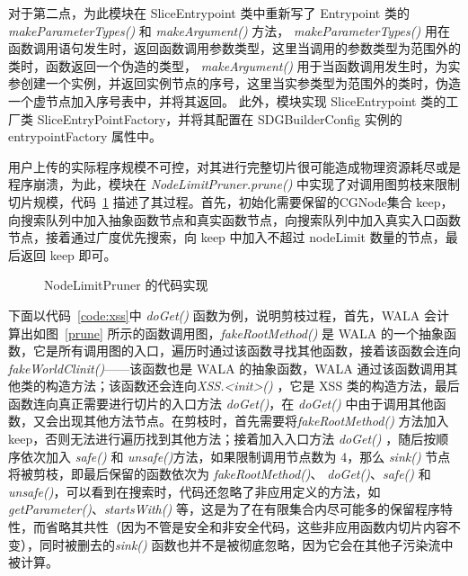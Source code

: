 对于第二点，为此模块在 SliceEntrypoint 类中重新写了 Entrypoint 类的\textit{ makeParameterTypes()} 和 \textit{makeArgument()} 方法，\textit{ makeParameterTypes()} 用在函数调用语句发生时，返回函数调用参数类型，这里当调用的参数类型为范围外的类时，函数返回一个伪造的类型，\textit{ makeArgument()} 用于当函数调用发生时，为实参创建一个实例，并返回实例节点的序号，这里当实参类型为范围外的类时，伪造一个虚节点加入序号表中，并将其返回。
此外，模块实现 SliceEntrypoint 类的工厂类 SliceEntryPointFactory，并将其配置在 SDGBuilderConfig 实例的 entrypointFactory 属性中。


用户上传的实际程序规模不可控，对其进行完整切片很可能造成物理资源耗尽或是程序崩溃，为此，模块在 \textit{NodeLimitPruner.prune()} 中实现了对调用图剪枝来限制切片规模，代码~\ref{code:slicePruner} 描述了其过程。首先，初始化需要保留的CGNode集合 keep，向搜索队列中加入抽象函数节点和真实函数节点，向搜索队列中加入真实入口函数节点，接着通过广度优先搜索，向 keep 中加入不超过 nodeLimit 数量的节点，最后返回 keep 即可。

\begin{figure}[htbp]
    \centering
    \begin{minipage}{0.9\textwidth}
        
    \end{minipage}
    \caption{NodeLimitPruner 的代码实现}\label{code:slicePruner}
\end{figure}

下面以代码~\ref{code:xss}中 \textit{doGet()} 函数为例，说明剪枝过程，首先，WALA 会计算出如图~\ref{prune} 所示的函数调用图，\textit{fakeRootMethod()} 是 WALA 的一个抽象函数，它是所有调用图的入口，遍历时通过该函数寻找其他函数，接着该函数会连向 \textit{fakeWorldClinit()}——该函数也是 WALA 的抽象函数，WALA 通过该函数调用其他类的构造方法；该函数还会连向\textit{XSS.<init>()} ，它是 XSS 类的构造方法，最后函数连向真正需要进行切片的入口方法 \textit{doGet()}，在 \textit{doGet()} 中由于调用其他函数，又会出现其他方法节点。在剪枝时，首先需要将\textit{fakeRootMethod()} 方法加入 keep，否则无法进行遍历找到其他方法；接着加入入口方法 \textit{doGet()} ，随后按顺序依次加入 \textit{safe()} 和 \textit{unsafe()}方法，如果限制调用节点数为 4，那么 \textit{sink()} 节点将被剪枝，即最后保留的函数依次为 \textit{fakeRootMethod()}、 \textit{doGet()}、\textit{safe()} 和 \textit{unsafe()}，可以看到在搜索时，代码还忽略了非应用定义的方法，如\textit{getParameter()}、\textit{startsWith()} 等，这是为了在有限集合内尽可能多的保留程序特性，而省略其共性（因为不管是安全和非安全代码，这些非应用函数内切片内容不变），同时被删去的\textit{sink()} 函数也并不是被彻底忽略，因为它会在其他子污染流中被计算。
    
